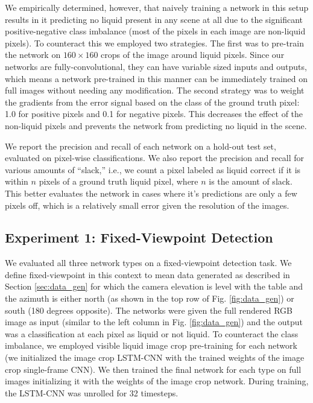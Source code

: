 \documentclass[runningheads,a4paper]{llncs}
\begin{document}
We empirically determined, however, that naively training a network in this setup results in it predicting no liquid present in any scene at all due to the significant positive-negative class imbalance (most of the pixels in each image are non-liquid pixels). To counteract this we employed two strategies. The first was to pre-train the network on $160 \times 160$ crops of the image around liquid pixels. Since our networks are fully-convolutional, they can have variable sized inputs and outputs, which means a network pre-trained in this manner can be immediately trained on full images without needing any modification. The second strategy was to weight the gradients from the error signal based on the class of the ground truth pixel: 1.0 for positive pixels and 0.1 for negative pixels. This decreases the effect of the non-liquid pixels and prevents the network from predicting no liquid in the scene.

We report the precision and recall of each network on a hold-out test set, evaluated on pixel-wise classifications. We also report the precision and recall for various amounts of ``slack,'' i.e., we count a pixel labeled as liquid correct if it is within $n$ pixels of a ground truth liquid pixel, where $n$ is the amount of slack. This better evaluates the network in cases where it's predictions are only a few pixels off, which is a relatively small error given the resolution of the images.

\vspace{-0.3cm}
\subsection{Experiment 1: Fixed-Viewpoint Detection}
\vspace{-0.3cm}

We evaluated all three network types on a fixed-viewpoint detection task. 
We define fixed-viewpoint in this context to mean data generated as described in Section \ref{sec:data_gen} for which the camera elevation is level with the table and the azimuth is either north (as shown in the top row of Fig. \ref{fig:data_gen}) or south (180 degrees opposite). 
The networks were given the full rendered RGB image as input (similar to the left column in Fig. \ref{fig:data_gen}) and the output was a classification at each pixel as liquid or not liquid. 
To counteract the class imbalance, we employed visible liquid image crop pre-training for each network (we initialized the image crop LSTM-CNN with the trained weights of the image crop single-frame CNN). 
We then trained the final network for each type on full images initializing it with the weights of the image crop network. 
During training, the LSTM-CNN was unrolled for 32 timesteps.
\end{document}
